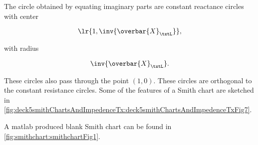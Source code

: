The circle obtained by equating imaginary parts are constant reactance circles with center

\begin{dmath}\label{eqn:uwavesDeck5SmithChartCore:640}
\lr{ 1, \inv{\overbar{X}_\txtL } },
\end{dmath}

with radius

\begin{dmath}\label{eqn:uwavesDeck5SmithChartCore:660}
\inv{\overbar{X}_\txtL}.
\end{dmath}

These circles also pass through the point \( (1,0) \).  These circles are orthogonal to the constant resistance circles.  Some of the features of a Smith chart are sketched in \cref{fig:deck5smithChartsAndImpedenceTx:deck5smithChartsAndImpedenceTxFig7}.


A matlab produced blank Smith chart can be found in \cref{fig:smithchart:smithchartFig1}.


